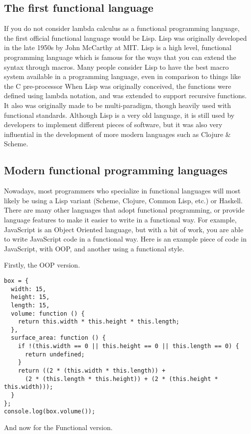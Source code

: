 \documentclass{report}
\begin{document}
\subsection{The first functional language}
If you do not consider lambda calculus as a functional programming language, the first official functional language would be Lisp. Lisp was originally developed in the late 1950s by John McCarthy at MIT. Lisp is a high level, functional programming language which is famous for the ways that you can extend the syntax through macros. Many people consider Lisp to have the best macro system available in a programming language, even in comparison to things like the C pre-processor 
When Lisp was originally conceived, the functions were defined using lambda notation, and was extended to support recursive functions. It also was originally made to be multi-paradigm, though heavily used with functional standards. Although Lisp is a very old language, it is still used by developers to implement different pieces of software, but it was also very influential in the development of more modern languages such as Clojure \& Scheme.
\subsection{Modern functional programming languages}
Nowadays, most programmers who specialize in functional languages will most likely be using a Lisp variant (Scheme, Clojure, Common Lisp, etc.) or Haskell. There are many other languages that adopt functional programming, or provide language features to make it easier to write in a functional way. For example, JavaScript is an Object Oriented language, but with a bit of work, you are able to write JavaScript code in a functional way. Here is an example piece of code in JavaScript, with OOP, and another using a functional style.

Firstly, the OOP version.

\begin{lstlisting}
box = {
  width: 15,
  height: 15,
  length: 15,
  volume: function () {
    return this.width * this.height * this.length;
  },
  surface_area: function () {
    if !(this.width == 0 || this.height == 0 || this.length == 0) {
      return undefined;
    }
    return ((2 * (this.width * this.length)) + 
      (2 * (this.length * this.height)) + (2 * (this.height * this.width)));
  }
};
console.log(box.volume());
\end{lstlisting}

And now for the Functional version.
\end{document}
